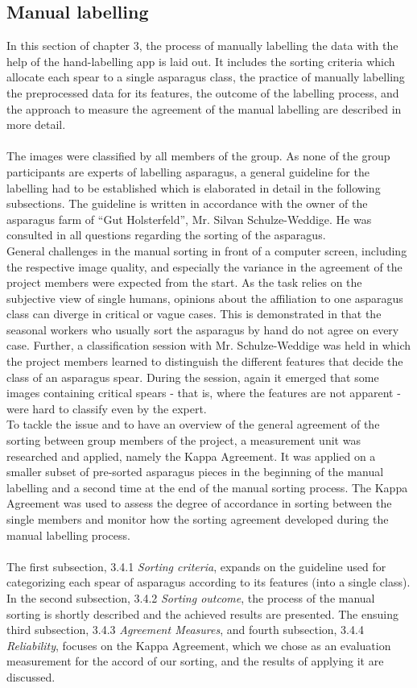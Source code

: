 \subsection{Manual labelling}

In this section of chapter 3, the process of manually labelling the data with the help of the hand-labelling app is laid out. It includes the sorting criteria which allocate each spear to a single asparagus class, the practice of manually labelling the preprocessed data for its features, the outcome of the labelling process, and the approach to measure the agreement of the manual labelling are described in more detail. \\
\\
The images were classified by all members of the group. As none of the group participants are experts of labelling asparagus, a general guideline for the labelling had to be established which is elaborated in detail in the following subsections. The guideline is written in accordance with the owner of the asparagus farm of “Gut Holsterfeld”, Mr. Silvan Schulze-Weddige. He was consulted in all questions regarding the sorting of the asparagus. \\
General challenges in the manual sorting in front of a computer screen, including the respective image quality, and especially the variance in the agreement of the project members were expected from the start. As the task relies on the subjective view of single humans, opinions about the affiliation to one asparagus class can diverge in critical or vague cases.  This is demonstrated in that the seasonal workers who usually sort the asparagus by hand do not agree on every case. Further, a classification session with Mr. Schulze-Weddige was held in which the project members learned to distinguish the different features that decide the class of an asparagus spear. During the session, again it emerged that some images containing critical spears - that is, where the features are not apparent - were hard to classify even by the expert. \\
To tackle the issue and to have an overview of the general agreement of the sorting between group members of the project, a measurement unit was researched and applied, namely the Kappa Agreement. It was applied on a smaller subset of pre-sorted asparagus pieces in the beginning of the manual labelling and a second time at the end of the manual sorting process. The Kappa Agreement was used to assess the degree of accordance in sorting between the single members and monitor how the sorting agreement developed during the manual labelling process. \\
\\
The first subsection, 3.4.1 \textit{Sorting criteria}, expands on the guideline used for categorizing each spear of asparagus according to its features (into a single class).
In the second subsection, 3.4.2 \textit{Sorting outcome}, the process of the manual sorting is shortly described and the achieved results are presented.
The ensuing third subsection, 3.4.3 \textit{Agreement Measures}, and fourth subsection, 3.4.4 \textit{Reliability}, focuses on the Kappa Agreement, which we chose as an evaluation measurement for the accord of our sorting, and the results of applying it are discussed.


